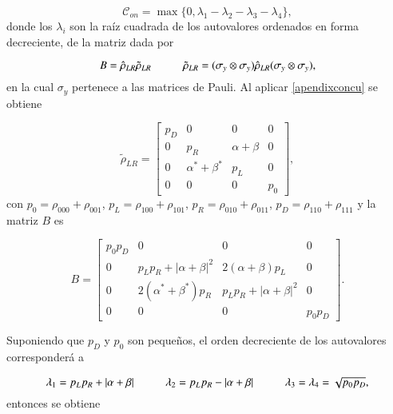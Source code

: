 \begin{appendixs}
\begin{equation*}
    \mathcal{C}_{on} = \max \{ 0,\lambda_{1} - \lambda_{2} - \lambda_{3} - \lambda_{4} \},
\end{equation*}
donde los $\lambda_{i}$ son la raíz cuadrada de los autovalores ordenados en forma decreciente, de la matriz dada por 

\begin{equation}
    B = \hat{\rho}_{LR} \tilde{\rho}_{LR} \hspace{10mm} \tilde{\rho}_{LR} = (\sigma_{y} \otimes \sigma_{y}) \hat{\rho}_{LR} (\sigma_{y} \otimes \sigma_{y}),
    \label{apendixconcu}
\end{equation}
en la cual $\sigma_{y}$ pertenece a las matrices de Pauli. Al aplicar \ref{apendixconcu} se obtiene 

\begin{equation*}
    \tilde{\rho}_{LR} = 
    \begin{bmatrix}
        p_{D} & 0 & 0 & 0  \\
        0 & p_{R} & \alpha + \beta & 0  \\
        0 & \alpha^{*} +\beta^{*} & p_{L} & 0  \\
        0 & 0 & 0 & p_{0} 
        \end{bmatrix},
\end{equation*}
con  $p_{0}=\rho_{000}+\rho_{001}$, $p_{L}=\rho_{100} + \rho_{101}$, $p_{R}=\rho_{010}+\rho_{011}$, $p_{D}=\rho_{110}+\rho_{111}$  y la matriz $B$ es

\begin{equation*}
    B = 
    \begin{bmatrix}
        p_{0}p_{D} & 0 & 0 & 0  \\
        0 & p_{L}p_{R}+|\alpha+\beta|^{2} & 2(\alpha + \beta)p_{L} & 0  \\
        0 & 2(\alpha^{*} +\beta^{*})p_{R} & p_{L}p_{R}+|\alpha+\beta|^{2}  & 0  \\
        0 & 0 & 0 & p_{0}p_{D}
        \end{bmatrix}.
\end{equation*}

Suponiendo que $p_{D}$ y $p_{0}$ son pequeños, el orden decreciente de los autovalores corresponderá a

\begin{equation*}
    \lambda_{1} = p_{L}p_{R} + |\alpha + \beta| \hspace{10mm}  \lambda_{2} = p_{L}p_{R} - |\alpha + \beta| \hspace{10mm} \lambda_{3}=\lambda_{4} = \sqrt{p_{0}p_{D}},
\end{equation*}
entonces se obtiene


\end{appendixs}

